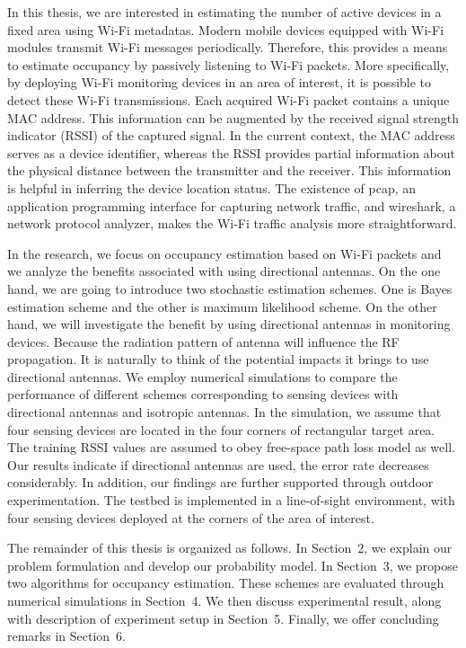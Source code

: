 In this thesis, we are interested in estimating the number of active devices in a fixed area using Wi-Fi metadatas.
Modern mobile devices equipped with Wi-Fi modules transmit Wi-Fi messages periodically.
Therefore, this provides a means to estimate occupancy by passively listening to Wi-Fi packets.
More specifically, by deploying Wi-Fi monitoring devices in an area of interest, it is possible to detect these Wi-Fi transmissions.
Each acquired Wi-Fi packet contains a unique MAC address.
This information can be augmented by the received signal strength indicator (RSSI) of the captured signal.
In the current context, the MAC address serves as a device identifier, whereas the RSSI provides partial information about the physical distance between the transmitter and the receiver. This information is helpful in inferring the device location status.
The existence of pcap, an application programming interface for capturing network traffic, and wireshark, a network protocol analyzer, makes the Wi-Fi traffic analysis more straightforward. 

In the research, we focus on occupancy estimation based on Wi-Fi packets and we analyze the benefits associated with using directional antennas.
On the one hand, we are going to introduce two stochastic estimation schemes.
One is Bayes estimation scheme and the other is maximum likelihood scheme.
On the other hand, we will investigate the benefit by using directional antennas in monitoring devices.  Because the radiation pattern of antenna will influence the RF propagation. It is naturally to think of the potential impacts it brings to use directional antennas. 
We employ numerical simulations to compare the performance of different schemes corresponding to sensing devices with directional antennas and isotropic antennas.
In the simulation, we assume that four sensing devices are located in the four corners of rectangular target area. The training RSSI values are assumed to obey free-space path loss model as well. Our results indicate if directional antennas are used, the error rate decreases considerably.
In addition, our findings are further supported through outdoor experimentation.
The testbed is implemented in a line-of-sight environment, with four sensing devices deployed at the corners of the area of interest.

The remainder of this thesis is organized as follows.
In Section~2, we explain our problem formulation and develop our probability model.
In Section~3, we propose two algorithms for occupancy estimation.
These schemes are evaluated through numerical simulations in Section~4.
We then discuss experimental result, along with description of experiment setup in Section~5.
Finally, we offer concluding remarks in Section~6.

 






 


